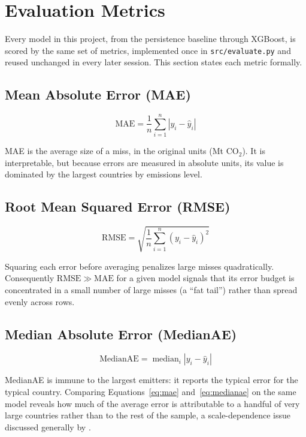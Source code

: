 \section{Evaluation Metrics}
\label{sec:metrics}

Every model in this project, from the persistence baseline through
XGBoost, is scored by the same set of metrics, implemented once in
\texttt{src/evaluate.py} and reused unchanged in every later session. This
section states each metric formally.

\subsection{Mean Absolute Error (MAE)}

\begin{equation}
\label{eq:mae}
\mathrm{MAE} = \frac{1}{n}\sum_{i=1}^{n} \left| y_i - \hat y_i \right|
\end{equation}

MAE is the average size of a miss, in the original units (Mt CO$_2$). It is
interpretable, but because errors are measured in absolute units, its
value is dominated by the largest countries by emissions level.

\subsection{Root Mean Squared Error (RMSE)}

\begin{equation}
\label{eq:rmse}
\mathrm{RMSE} = \sqrt{\frac{1}{n}\sum_{i=1}^n \left(y_i - \hat y_i\right)^2}
\end{equation}

Squaring each error before averaging penalizes large misses quadratically.
Consequently $\mathrm{RMSE} \gg \mathrm{MAE}$ for a given model signals
that its error budget is concentrated in a small number of large misses (a
``fat tail'') rather than spread evenly across rows.

\subsection{Median Absolute Error (MedianAE)}

\begin{equation}
\label{eq:medianae}
\mathrm{MedianAE} = \operatorname{median}_i \left| y_i - \hat y_i \right|
\end{equation}

MedianAE is immune to the largest emitters: it reports the typical error
for the typical country. Comparing Equations~\ref{eq:mae}
and~\ref{eq:medianae} on the same model reveals how much of the average
error is attributable to a handful of very large countries rather than to
the rest of the sample, a scale-dependence issue discussed generally by
\cite{hyndman2006another}.

